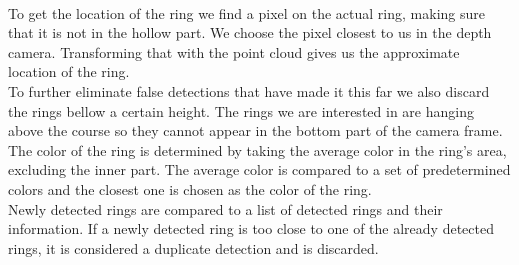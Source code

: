 \documentclass[a4paper,
  twoside, %
  headlines=2.1 %
  ]{scrartcl}
\begin{document}
\\
To get the location of the ring we find a pixel on the actual ring, making sure that it is not in the hollow part. We choose the pixel closest to us in the depth camera. Transforming that with the point cloud gives us the approximate location of the ring. 
\\
To further eliminate false detections that have made it this far we also discard the rings bellow a certain height. The rings we are interested in are hanging above the course so they cannot appear in the bottom part of the camera frame. 
\\
The color of the ring is determined by taking the average color in the ring’s area, excluding the inner part. The average color is compared to a set of predetermined colors and the closest one is chosen as the color of the ring. 
\\
Newly detected rings are compared to a list of detected rings and their information. If a newly detected ring is too close to one of the already detected rings, it is considered a duplicate detection and is discarded. 
\end{document}
